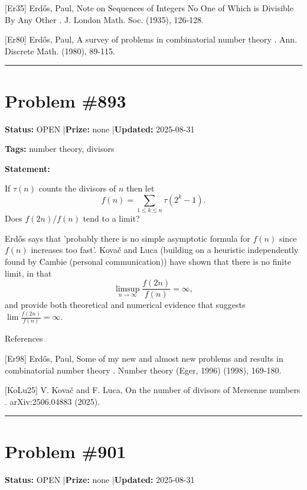 \documentclass{article}
\begin{document}
[Er35] Erd\H{o}s, Paul, Note on Sequences of Integers No One of Which is Divisible By Any Other . J. London Math. Soc. (1935), 126-128.

[Er80] Erd\H{o}s, Paul, A survey of problems in combinatorial number theory . Ann. Discrete Math. (1980), 89-115.

\noindent\rule{\linewidth}{0.4pt}


\section{Problem \#893}
\label{prob:893}

\noindent\textbf{Status:} OPEN \quad|\quad \textbf{Prize:} none \quad|\quad \textbf{Updated:} 2025-08-31

\noindent\textbf{Tags:} number theory, divisors

\medskip

\noindent\textbf{Statement:}

If $\tau(n)$ counts the divisors of $n$ then let\[f(n)=\sum_{1\leq k\leq n}\tau(2^k-1).\]Does $f(2n)/f(n)$ tend to a limit?




Erd\H{o}s \cite{Er98} says that 'probably there is no simple asymptotic formula for $f(n)$ since $f(n)$ increases too fast'. Kova\v{c} and Luca \cite{KoLu25} (building on a heuristic independently found by Cambie (personal communication)) have shown that there is no finite limit, in that\[\limsup_{n\to \infty}\frac{f(2n)}{f(n)}=\infty,\]and provide both theoretical and numerical evidence that suggests $\lim \frac{f(2n)}{f(n)}=\infty$.




References

[Er98] Erd\H{o}s, Paul, Some of my new and almost new problems and results in combinatorial number theory . Number theory (Eger, 1996) (1998), 169-180.

[KoLu25] V. Kova\v{c} and F. Luca, On the number of divisors of Mersenne numbers . arXiv:2506.04883 (2025).

\noindent\rule{\linewidth}{0.4pt}


\section{Problem \#901}
\label{prob:901}

\noindent\textbf{Status:} OPEN \quad|\quad \textbf{Prize:} none \quad|\quad \textbf{Updated:} 2025-08-31
\end{document}
